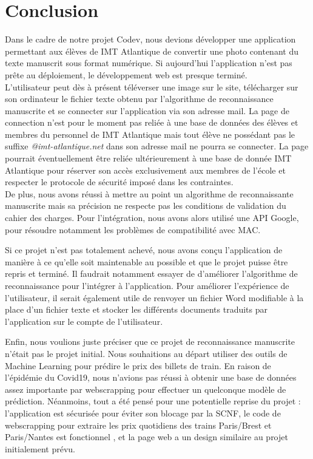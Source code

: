 \documentclass[oneside,a4paper,13pt]{article}
\begin{document}
\section{Conclusion}
Dans le cadre de notre projet Codev, nous devions développer une application permettant aux élèves de IMT Atlantique de convertir une photo contenant du texte manuscrit sous format numérique. Si aujourd'hui l'application n'est pas prête au déploiement, le développement web est presque terminé. \\
L'utilisateur peut dès à présent téléverser une image sur le site, télécharger sur son ordinateur le fichier texte obtenu par l'algorithme de reconnaissance manuscrite et se connecter sur l'application via son adresse mail. La page de connection n'est pour le moment pas reliée à une base de données des élèves et membres du personnel de IMT Atlantique mais tout élève ne possédant pas le suffixe \textit{@imt-atlantique.net} dans son adresse mail ne pourra se connecter. La page pourrait éventuellement être reliée ultérieurement à une base de donnée IMT Atlantique pour réserver son accès exclusivement aux membres de l'école et respecter le protocole de sécurité imposé dans les contraintes. \\
De plus, nous avons réussi à mettre au point un algorithme de reconnaissante manuscrite mais sa précision ne respecte pas les conditions de validation du cahier des charges. Pour l'intégration, nous avons alors utilisé une API Google, pour résoudre notamment les problèmes de compatibilité avec MAC. 

\medbreak
Si ce projet n'est pas totalement achevé, nous avons conçu l'application de manière à ce qu'elle soit maintenable au possible et que le projet puisse être repris et terminé. Il faudrait notamment essayer de d'améliorer l'algorithme de reconnaissance pour l'intégrer à l'application. Pour améliorer l'expérience de l'utilisateur, il serait également utile de renvoyer un fichier Word modifiable à la place d'un fichier texte et stocker les différents documents traduits par l'application sur le compte de l'utilisateur.  

\medbreak
Enfin, nous voulions juste préciser que ce projet de reconnaissance manuscrite n'était pas le projet initial. Nous souhaitions au départ utiliser des outils de Machine Learning pour prédire le prix des billets de train. En raison de l'épidémie du Covid19, nous n'avions pas réussi à obtenir une base de données assez importante par webscrapping pour effectuer un quelconque modèle de prédiction. Néanmoins, tout a été pensé pour une potentielle reprise du projet : l'application est sécurisée pour éviter son blocage par la SCNF, le code de webscrapping pour extraire les prix quotidiens des trains Paris/Brest et Paris/Nantes est fonctionnel , et la page web a un design similaire au projet initialement prévu.  
\end{document}
